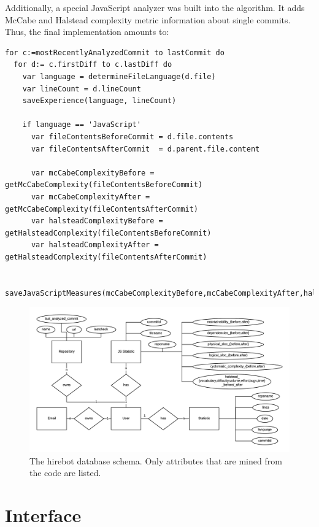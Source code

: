Additionally, a special JavaScript analyzer was built into the algorithm.
It adds McCabe and Halstead complexity metric information about single
commits. Thus, the final implementation amounts to:

\begin{minipage}{\linewidth}
\begin{lstlisting}[frame=false]
for c:=mostRecentlyAnalyzedCommit to lastCommit do
  for d:= c.firstDiff to c.lastDiff do
    var language = determineFileLanguage(d.file)
    var lineCount = d.lineCount
    saveExperience(language, lineCount)

    if language == 'JavaScript'
      var fileContentsBeforeCommit = d.file.contents
      var fileContentsAfterCommit  = d.parent.file.content

      var mcCabeComplexityBefore = getMcCabeComplexity(fileContentsBeforeCommit)
      var mcCabeComplexityAfter = getMcCabeComplexity(fileContentsAfterCommit)
      var halsteadComplexityBefore = getHalsteadComplexity(fileContentsBeforeCommit)
      var halsteadComplexityAfter = getHalsteadComplexity(fileContentsAfterCommit)

      saveJavaScriptMeasures(mcCabeComplexityBefore,mcCabeComplexityAfter,halsteadComplexityBefore,halsteadComplexityAfter)
\end{lstlisting}
\end{minipage}

\begin{figure}
  \centering
  \includegraphics[width=35em]{gfx/schema.png}
  \caption{The hirebot database schema. Only attributes that are mined from the code are listed.}
  \label{fig:schema}
\end{figure}

\section{Interface}
